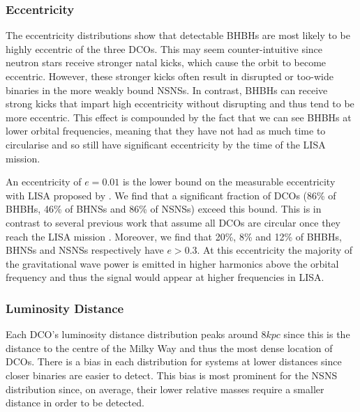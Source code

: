 \subsubsection{Eccentricity}
The eccentricity distributions show that detectable BHBHs are most likely to be highly eccentric of the three DCOs. This may seem counter-intuitive since neutron stars receive stronger natal kicks, which cause the orbit to become eccentric. However, these stronger kicks often result in disrupted or too-wide binaries in the more weakly bound NSNSs. In contrast, BHBHs can receive strong kicks that impart high eccentricity without disrupting and thus tend to be more eccentric. This effect is compounded by the fact that we can see BHBHs at lower orbital frequencies, meaning that they have not had as much time to circularise and so still have significant eccentricity by the time of the LISA mission.

An eccentricity of $e = 0.01$ is the lower bound on the measurable eccentricity with LISA proposed by \citet{Nishizawa+2016}. We find that a significant fraction of DCOs (86\% of BHBHs, 46\% of BHNSs and 86\% of NSNSs) exceed this bound. This is in contrast to several previous work that assume all DCOs are circular once they reach the LISA mission \citep[e.g.][]{Lamberts+2018, Sesana+2020}. Moreover, we find that 20\%, 8\% and 12\% of BHBHs, BHNSs and NSNSs respectively have $e > 0.3$. At this eccentricity the majority of the gravitational wave power is emitted in higher harmonics above the orbital frequency and thus the signal would appear at higher frequencies in LISA. 

\subsubsection{Luminosity Distance}
Each DCO's luminosity distance distribution peaks around $8 \unit{kpc}$ since this is the distance to the centre of the Milky Way and thus the most dense location of DCOs. There is a bias in each distribution for systems at lower distances since closer binaries are easier to detect. This bias is most prominent for the NSNS distribution since, on average, their lower relative masses require a smaller distance in order to be detected.

